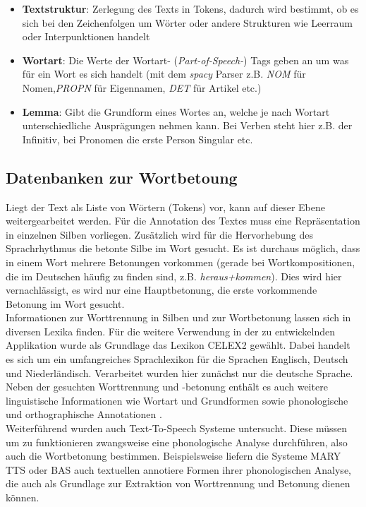 \begin{itemize}
	\item \textbf{Textstruktur}: Zerlegung des Texts in Tokens, dadurch wird bestimmt, ob es sich bei den Zeichenfolgen um Wörter oder andere Strukturen wie Leerraum oder Interpunktionen handelt
	
	\item \textbf{Wortart}: Die Werte der Wortart- (\textit{Part-of-Speech-}) Tags geben an um was für ein Wort es sich handelt (mit dem \textit{spacy} Parser z.B. \textit{NOM} für Nomen,\textit{PROPN} für Eigennamen, \textit{DET} für Artikel etc.)
	
	\item  \textbf{Lemma}: Gibt die Grundform eines Wortes an, welche je nach Wortart unterschiedliche Ausprägungen nehmen kann. Bei Verben steht hier z.B. der Infinitiv, bei Pronomen die erste Person Singular etc. 
\end{itemize}

\subsection{Datenbanken zur Wortbetoung}
Liegt der Text als Liste von Wörtern (Tokens) vor, kann auf dieser Ebene weitergearbeitet werden. Für die Annotation des Textes muss eine Repräsentation in einzelnen Silben vorliegen. Zusätzlich wird für die Hervorhebung des Sprachrhythmus die betonte Silbe im Wort gesucht. Es ist durchaus möglich, dass in einem Wort mehrere Betonungen vorkommen (gerade bei Wortkompositionen, die im Deutschen häufig zu finden sind, z.B. \textit{heraus+kommen}). Dies wird hier vernachlässigt, es wird nur eine Hauptbetonung, die erste vorkommende Betonung im Wort gesucht.\\
Informationen zur Worttrennung in Silben und zur Wortbetonung lassen sich in diversen Lexika finden.  Für die weitere Verwendung in der zu entwickelnden Applikation wurde als Grundlage das Lexikon CELEX2 gewählt. Dabei handelt es sich um ein umfangreiches Sprachlexikon für die Sprachen Englisch, Deutsch und Niederländisch. Verarbeitet wurden hier zunächst nur die deutsche Sprache. Neben der gesuchten Worttrennung und -betonung enthält es auch weitere linguistische Informationen wie Wortart und Grundformen sowie phonologische und orthographische Annotationen  .
\\
Weiterführend wurden auch Text-To-Speech Systeme  untersucht. Diese müssen um zu funktionieren zwangsweise eine phonologische Analyse durchführen, also auch die Wortbetonung bestimmen. Beispielsweise liefern die Systeme MARY TTS oder BAS auch textuellen annotiere Formen ihrer phonologischen Analyse, die auch als Grundlage zur Extraktion von Worttrennung und Betonung dienen können.\\

